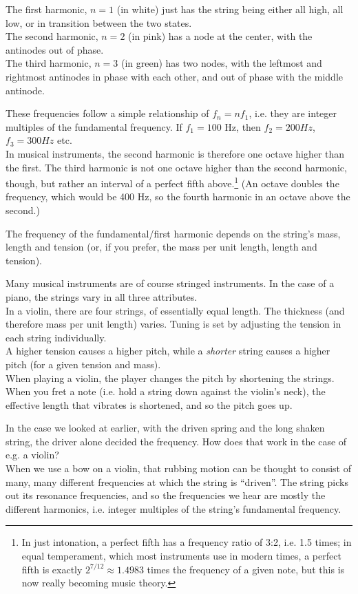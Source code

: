 The first harmonic, $n=1$ (in white) just has the string being either all high, all low, or in transition between the two states.\\
The second harmonic, $n=2$ (in pink) has a node at the center, with the antinodes out of phase.\\
The third harmonic, $n=3$ (in green) has two nodes, with the leftmost and rightmost antinodes in phase with each other, and out of phase with the middle antinode.

These frequencies follow a simple relationship of $f_n = n f_1$, i.e. they are integer multiples of the fundamental frequency. If $f_1 = 100$ Hz, then $f_2 = 200 Hz$, $f_3 = 300 Hz$ etc.\\
In musical instruments, the second harmonic is therefore one octave higher than the first. The third harmonic is not one octave higher than the second harmonic, though, but rather an interval of a perfect fifth above.\footnote{In just intonation, a perfect fifth has a frequency ratio of 3:2, i.e. 1.5 times; in equal temperament, which most instruments use in modern times, a perfect fifth is exactly $2^{7/12} \approx 1.4983$ times the frequency of a given note, but this is now really becoming music theory.}  (An octave doubles the frequency, which would be 400 Hz, so the fourth harmonic in an octave above the second.)

The frequency of the fundamental/first harmonic depends on the string's mass, length and tension (or, if you prefer, the mass per unit length, length and tension).

Many musical instruments are of course stringed instruments. In the case of a piano, the strings vary in all three attributes.\\
In a violin, there are four strings, of essentially equal length. The thickness (and therefore mass per unit length) varies. Tuning is set by adjusting the tension in each string individually.\\
A higher tension causes a higher pitch, while a \emph{shorter} string causes a higher pitch (for a given tension and mass).\\
When playing a violin, the player changes the pitch by shortening the strings. When you fret a note (i.e. hold a string down against the violin's neck), the effective length that vibrates is shortened, and so the pitch goes up.

In the case we looked at earlier, with the driven spring and the long shaken string, the driver alone decided the frequency. How does that work in the case of e.g. a violin?\\
When we use a bow on a violin, that rubbing motion can be thought to consist of many, many different frequencies at which the string is ``driven''. The string picks out its resonance frequencies, and so the frequencies we hear are mostly the different harmonics, i.e. integer multiples of the string's fundamental frequency.

